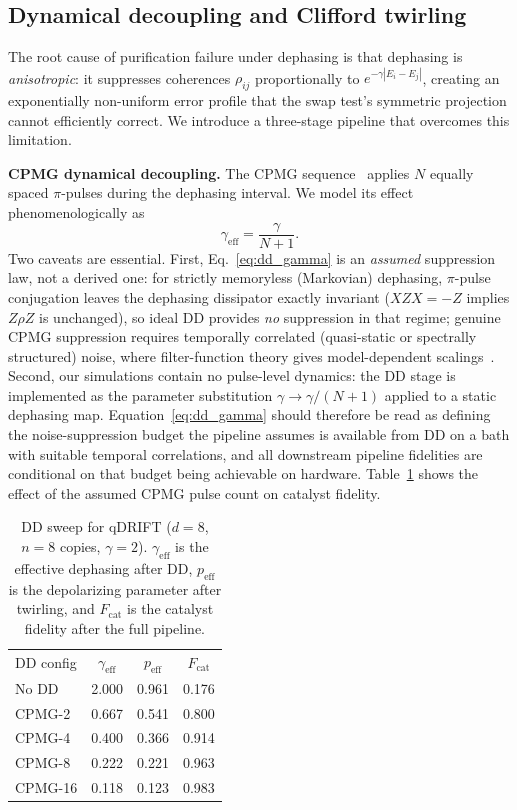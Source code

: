 \documentclass[pra,twocolumn,superscriptaddress,longbibliography,floatfix]{revtex4-2}
\begin{document}
\subsection{Dynamical decoupling and Clifford twirling}
\label{sec:dd_twirl}

The root cause of purification failure under dephasing is that dephasing is \emph{anisotropic}: it suppresses coherences $\rho_{ij}$ proportionally to $e^{-\gamma|E_i - E_j|}$, creating an exponentially non-uniform error profile that the swap test's symmetric projection cannot efficiently correct.
We introduce a three-stage pipeline that overcomes this limitation.

\textbf{CPMG dynamical decoupling.}
The CPMG sequence~\cite{MeiboomGill1958,Viola1999} applies $N$ equally spaced $\pi$-pulses during the dephasing interval.
We model its effect phenomenologically as
\begin{equation}
\gamma_\mathrm{eff} = \frac{\gamma}{N + 1}.
\label{eq:dd_gamma}
\end{equation}
Two caveats are essential.
First, Eq.~\eqref{eq:dd_gamma} is an \emph{assumed} suppression law, not a derived one: for strictly memoryless (Markovian) dephasing, $\pi$-pulse conjugation leaves the dephasing dissipator exactly invariant ($XZX = -Z$ implies $Z\rho Z$ is unchanged), so ideal DD provides \emph{no} suppression in that regime; genuine CPMG suppression requires temporally correlated (quasi-static or spectrally structured) noise, where filter-function theory gives model-dependent scalings~\cite{Viola1999}.
Second, our simulations contain no pulse-level dynamics: the DD stage is implemented as the parameter substitution $\gamma \to \gamma/(N+1)$ applied to a static dephasing map.
Equation~\eqref{eq:dd_gamma} should therefore be read as defining the noise-suppression budget the pipeline assumes is available from DD on a bath with suitable temporal correlations, and all downstream pipeline fidelities are conditional on that budget being achievable on hardware.
Table~\ref{tab:dd_sweep} shows the effect of the assumed CPMG pulse count on catalyst fidelity.

\begin{table}[tb]
\caption{DD sweep for qDRIFT ($d = 8$, $n = 8$ copies, $\gamma = 2$). $\gamma_\mathrm{eff}$ is the effective dephasing after DD, $p_\mathrm{eff}$ is the depolarizing parameter after twirling, and $F_\mathrm{cat}$ is the catalyst fidelity after the full pipeline.}
\label{tab:dd_sweep}
\centering\footnotesize
\setlength{\tabcolsep}{3pt}
\begin{ruledtabular}
\begin{tabular}{lccc}
DD config & $\gamma_\mathrm{eff}$ & $p_\mathrm{eff}$ & $F_\mathrm{cat}$ \\
\colrule
No DD & 2.000 & 0.961 & 0.176 \\
CPMG-2 & 0.667 & 0.541 & 0.800 \\
CPMG-4 & 0.400 & 0.366 & 0.914 \\
CPMG-8 & 0.222 & 0.221 & 0.963 \\
CPMG-16 & 0.118 & 0.123 & 0.983 \\
\end{tabular}
\end{ruledtabular}
\end{table}
\end{document}
